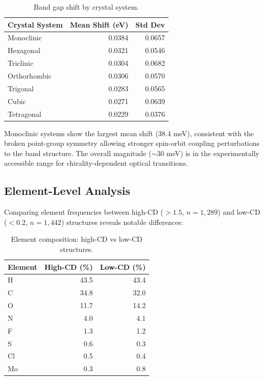 \documentclass[11pt,a4paper]{article}
\begin{document}
\begin{table}[H]
\centering
\caption{Band gap shift by crystal system.}
\label{tab:bandgap}
\begin{tabular}{lrr}
\toprule
Crystal System & Mean Shift (eV) & Std Dev \\
\midrule
Monoclinic & 0.0384 & 0.0657 \\
Hexagonal & 0.0321 & 0.0546 \\
Triclinic & 0.0304 & 0.0682 \\
Orthorhombic & 0.0306 & 0.0570 \\
Trigonal & 0.0283 & 0.0565 \\
Cubic & 0.0271 & 0.0639 \\
Tetragonal & 0.0229 & 0.0376 \\
\bottomrule
\end{tabular}
\end{table}

\noindent Monoclinic systems show the largest mean shift (38.4 meV), consistent with the broken point-group symmetry allowing stronger spin-orbit coupling perturbations to the band structure. The overall magnitude ($\sim$30 meV) is in the experimentally accessible range for chirality-dependent optical transitions.

\subsection{Element-Level Analysis}

Comparing element frequencies between high-CD ($>1.5$, $n=1,289$) and low-CD ($<0.2$, $n=1,442$) structures reveals notable differences:

\begin{table}[H]
\centering
\caption{Element composition: high-CD vs low-CD structures.}
\label{tab:elements}
\begin{tabular}{lrr}
\toprule
Element & High-CD (\%) & Low-CD (\%) \\
\midrule
H & 43.5 & 43.4 \\
C & 34.8 & 32.0 \\
O & 11.7 & 14.2 \\
N & 4.0 & 4.1 \\
F & 1.3 & 1.2 \\
S & 0.6 & 0.3 \\
Cl & 0.5 & 0.4 \\
Mo & 0.3 & 0.8 \\
\bottomrule
\end{tabular}
\end{table}
\end{document}
